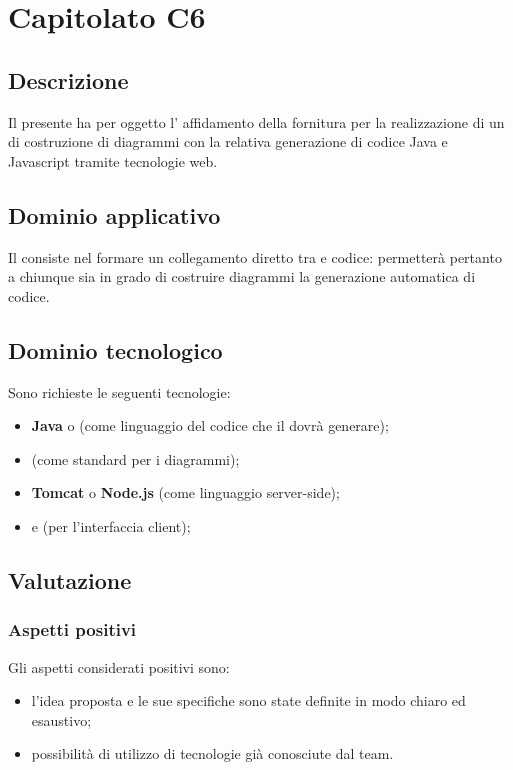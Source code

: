 \section {Capitolato C6}
	\subsection {Descrizione}
	Il presente  ha per oggetto l’ affidamento della fornitura per la realizzazione
di un  di costruzione di diagrammi  con la relativa generazione di codice
Java e Javascript tramite tecnologie web.
	\subsection {Dominio applicativo}
	Il  consiste nel formare un collegamento diretto tra  e codice: permetterà pertanto a chiunque sia in grado di costruire diagrammi  la generazione automatica di codice.
	\subsection {Dominio tecnologico}
	Sono richieste le seguenti tecnologie:
	\begin {itemize}
	\item \textbf{Java} o \textbf{} (come linguaggio del codice che il  dovrà generare);
	\item \textbf{} (come standard per i diagrammi);
	\item \textbf{Tomcat} o \textbf{Node.js} (come linguaggio server-side);
	\item \textbf{} e \textbf{} (per l'interfaccia client);
	\end {itemize}
	\subsection {Valutazione}
		\subsubsection {Aspetti positivi}
		Gli aspetti considerati positivi sono:
			\begin {itemize}
			 	\item l'idea proposta e le sue specifiche sono state definite in modo chiaro ed esaustivo;
			 	\item possibilità di utilizzo di tecnologie già conosciute dal team.
			\end {itemize}
